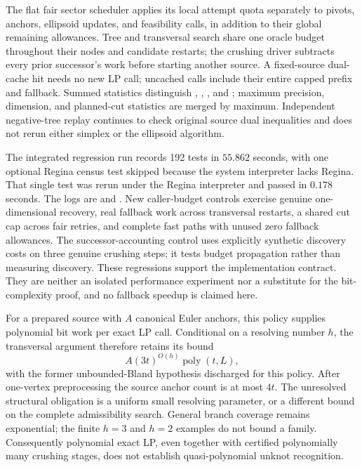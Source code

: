 The flat fair sector scheduler applies its local attempt quota separately
to pivots, anchors, ellipsoid updates, and feasibility calls, in addition
to their global remaining allowances.  Tree and transversal search share
one oracle budget throughout their nodes and candidate restarts; the
crushing driver subtracts every prior successor's work before starting
another source.  A fixed-source dual-cache hit needs no new LP call;
uncached calls include their entire capped prefix and fallback.  Summed
statistics distinguish , ,
, and ; maximum
precision, dimension, and planned-cut statistics are merged by maximum.
Independent negative-tree replay continues to check original source dual
inequalities and does not rerun either simplex or the ellipsoid algorithm.

The integrated regression run records 192 tests in $55.862$ seconds,
with one optional Regina census test skipped because the system interpreter
lacks Regina.  That single test was rerun under the Regina interpreter and
passed in $0.178$ seconds.  The logs are
 and
.  New caller-budget controls
exercise genuine one-dimensional recovery, real fallback work across
transversal restarts, a shared cut cap across fair retries, and complete
fast paths with unused zero fallback allowances.  The successor-accounting
control uses explicitly synthetic discovery costs on three genuine crushing
steps; it tests budget propagation rather than measuring discovery.  These
regressions support the implementation contract.  They are neither an
isolated performance experiment nor a substitute for the bit-complexity
proof, and no fallback speedup is claimed here.

For a prepared source with $A$ canonical Euler anchors, this policy supplies
polynomial bit work per exact LP call.  Conditional on a resolving number
$h$, the transversal argument therefore retains its bound
\[
 A(3t)^{O(h)}\operatorname{poly}(t,L),
\]
with the former unbounded-Bland hypothesis discharged for this policy.
After one-vertex preprocessing the source anchor count is at most $4t$.
The unresolved structural obligation is a uniform small resolving parameter,
or a different bound on the complete admissibility search.  General branch
coverage remains exponential; the finite $h=3$ and $h=2$ examples do not bound
a family.  Consequently polynomial exact LP, even together with certified
polynomially many crushing stages, does not establish quasi-polynomial
unknot recognition.

